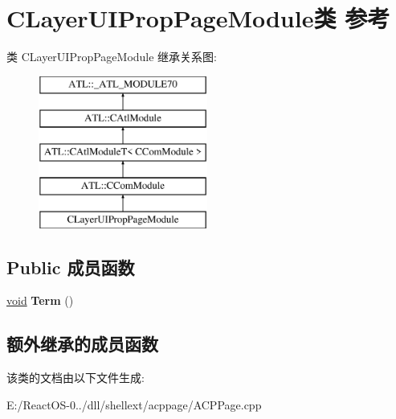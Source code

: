 \hypertarget{class_c_layer_u_i_prop_page_module}{}\section{C\+Layer\+U\+I\+Prop\+Page\+Module类 参考}
\label{class_c_layer_u_i_prop_page_module}
类 C\+Layer\+U\+I\+Prop\+Page\+Module 继承关系图\+:\begin{figure}[H]
\begin{center}
\leavevmode
\includegraphics[height=5.000000cm]{class_c_layer_u_i_prop_page_module}
\end{center}
\end{figure}
\subsection*{Public 成员函数}
\begin{DoxyCompactItemize}
\item 
\mbox{\label{class_c_layer_u_i_prop_page_module_a024e6d231406df03a875c838f3bb361e}} 
\hyperlink{interfacevoid}{void} {\bfseries Term} ()
\end{DoxyCompactItemize}
\subsection*{额外继承的成员函数}


该类的文档由以下文件生成\+:\begin{DoxyCompactItemize}
\item 
E\+:/\+React\+O\+S-\/0../dll/shellext/acppage/A\+C\+P\+Page.\+cpp\end{DoxyCompactItemize}
